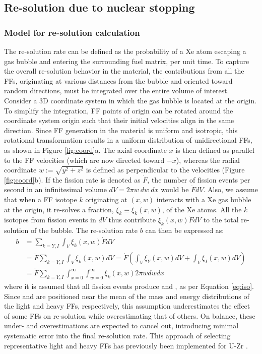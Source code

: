 \documentclass[review]{elsarticle}
\newcommand{\Y}{\ce{_{39}^{97}Y}\xspace}
\newcommand{\I}{\ce{_{53}^{136}I}\xspace}
\begin{document}
\subsection{Re-solution due to nuclear stopping}
\label{sec:nuke}

\subsubsection{Model for re-solution calculation}

The re-solution rate can be defined as the probability
of a Xe atom escaping a gas bubble and entering the surrounding fuel matrix,
per unit time.
To capture the overall re-solution behavior in the material,
the contributions from all the FFs,
originating at various distances from the bubble
and oriented toward random directions,
must be integrated over the entire volume of interest.
Consider a 3D coordinate system
in which the gas bubble is located at the origin.
To simplify the integration,
FF points of origin can be rotated around the coordinate system origin
such that their initial velocities align in the same direction.
Since FF generation in the material is uniform and isotropic,
this rotational transformation results in
a uniform distribution of unidirectional FFs,
as shown in Figure \ref{fig:coord}a.
The axial coordinate $x$ is then defined as
parallel to the FF velocities (which are now directed toward $-x$),
whereas the radial coordinate $w := \sqrt{y^2+z^2}$ is defined as
perpendicular to the velocities (Figure \ref{fig:coord}b).
If the fission rate is denoted as $\dot{F}$,
the number of fission events per second
in an infinitesimal volume $dV = 2 \pi w \: dw  \: dx$ would be $\dot{F} dV$.
Also, we assume that when a FF isotope $k$ originating at $(x, w)$
interacts with a Xe gas bubble at the origin,
it re-solves a fraction, $\xi_k \equiv \xi_k(x, w)$, of the Xe atoms.
All the $k$ isotopes from fission events in $dV$ thus contribute
$\xi_k(x, w) \dot{F} dV$ to the total re-solution of the bubble.
The re-solution rate $b$ can then be expressed as:
\begin{align}
	b &= \sum_{k = Y, I} \int_V \xi_k(x, w) \dot{F} dV \label{eq:b} \\
	  &= \dot{F} \sum_{k = Y, I} \int_V \xi_k(x, w) dV
	   = \dot{F} \left( \int_V \xi_Y(x, w) dV + \int_V \xi_I(x, w) dV \right) \\
	  &= \dot{F} \sum_{k = Y, I} \int_{x=0}^{\infty} \int_{w=0}^{\infty}
		\xi_k(x, w) 2 \pi w dw dx
\end{align}
where it is assumed that all fission events produce \Y and \I,
as per Equation \ref{eq:iso}.
Since \Y and \I are positioned near the mean
of the mass and energy distributions of the light and heavy FFs, respectively,
this assumption underestimates the effect of some FFs on re-solution
while overestimating that of others.
On balance, these under- and overestimations are expected to cancel out,
introducing minimal systematic error into the final re-solution rate.
This approach of selecting representative light and heavy FFs
has previously been implemented for U-Zr \cite{mao2025}.
\end{document}
